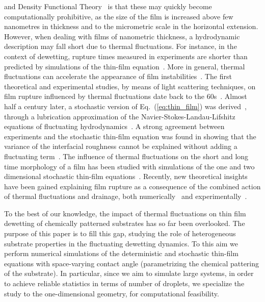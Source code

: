 and Density Functional Theory~\cite{PhysRevA.40.2567, tarazona1984simple, meister1985density, hughes2014introduction} is that these 
may quickly become computationally prohibitive, as the size of the film is increased above few nanometres in thickness and to the micrometric scale in the horizontal extension.
However, when dealing with films of nanometric thickness, a hydrodynamic description may fall short due to thermal fluctuations. 
For instance, in the context of dewetting, rupture times measured in experiments are shorter than predicted by simulations of the thin-film equation~\cite{herminghaus1996dewetting,herminghaus1998dewetting,becker2003complex}.
More in general, thermal fluctuations can accelerate the appearance of film instabilities~\cite{Rauscher2008,tsekov1993effect, PhysRevLett.99.114503, PhysRevE.100.023108}.
The first theoretical and experimental studies, by means of light scattering techniques, on film rupture influenced by thermal fluctuations date back to the 60s~\cite{doi:10.1021/ja01014a015}.
Almost half a century later, a stochastic version of Eq.~(\ref{eq:thin_film}) was derived~\cite{Grun2006, Mecke_2005, PhysRevLett.95.244505}, through a lubrication approximation of the Navier-Stokes-Landau-Lifshitz 
equations of fluctuating hydrodynamics~\cite{Landau1987Fluid}.
A strong agreement between experiments and the stochastic thin-film equation was found in showing that the variance of the interfacial roughness cannot be explained without adding a fluctuating term~\cite{PhysRevLett.99.114503}.
The influence of thermal fluctuations on the short and long time morphology of a film has been studied with simulations of the one and two dimensional stochastic thin-film equations~\cite{PhysRevE.92.061002, alizadeh_pahlavan_cueto-felgueroso_hosoi_mckinley_juanes_2018}. 
Recently, new theoretical insights have been gained explaining film rupture as a consequence of the combined action of thermal fluctuations and drainage, both numerically~\cite{shah_van_steijn_kleijn_kreutzer_2019} and experimentally~\cite{PhysRevLett.125.158001}.

To the best of our knowledge, the impact of thermal fluctuations on thin film dewetting
of chemically patterned substrates has so far been overlooked.
The purpose of this paper is to fill this gap, studying the role of heterogeneous substrate properties in the fluctuating dewetting dynamics.
To this aim we perform numerical simulations of the deterministic and stochastic thin-film equations with space-varying contact angle 
(parametrizing the chemical pattering of the substrate). In particular, since we aim to simulate large systems, in order to achieve reliable 
statistics in terms of number of droplets, we specialize the study to the one-dimensional geometry, for computational feasibility.

